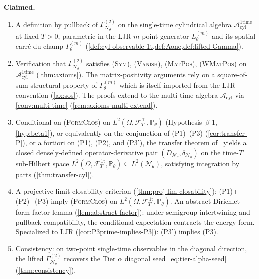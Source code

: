 \documentclass[11pt,reqno]{amsart}
\theoremstyle{plain}
\theoremstyle{definition}
\theoremstyle{remark}
\newcommand{\Prob}{\mathbb P}
\newcommand{\cA}{\mathcal A}
\newcommand{\cF}{\mathcal F}
\newcommand{\cN}{\mathcal N}
\newcommand{\Acyl}{\cA_{\mathrm{cyl}}}
\newcommand{\Aone}{\cA_{\mathrm{cyl}}^{\mathrm{1time}}}
\newcommand{\FT}{\cF_{T}^{\,\mathrm{1t}}}
\newcommand{\Hone}{L^{2}(\Omega,\FT,\Pth)}
\newcommand{\GamN}{\Gamma^{(2)}_{\cN_{\theta}}}
\newcommand{\GamM}[1]{\Gamma^{(#1)}_{\theta}}
\newcommand{\Lth}[1]{L^{(#1)}_{\theta}}
\newcommand{\DN}{D_{\cN_{\theta}}}
\newcommand{\divN}{\delta_{\cN_{\theta}}}
\newcommand{\Pth}{\Prob_{\theta}}
\begin{document}
\textbf{Claimed.}
\begin{enumerate}
\item A definition by pullback of $\GamN$ on the single-time
cylindrical algebra $\Aone$ at fixed $T>0$, parametric in the LJR
$m$-point generator $\Lth{m}$ and its spatial carr\'e-du-champ
$\GamM{m}$
(\cref{def:cyl-observable-1t,def:Aone,def:lifted-Gamma}).

\item Verification that $\GamN$ satisfies
{\normalfont\textsc{(Sym)}}, {\normalfont\textsc{(Vanish)}},
{\normalfont\textsc{(MatPos)}}, {\normalfont\textsc{(WMatPos)}} on
$\Aone$ (\cref{thm:axioms}). The matrix-positivity arguments rely
on a square-of-sum structural property of $\GamM{m}$ which is
itself imported from the LJR convention (\cref{ax:sos}). The
proofs extend to the multi-time algebra $\Acyl$ via
\cref{conv:multi-time} (\cref{rem:axioms-multi-extend}).

\item Conditional on {\normalfont\textsc{(FormClos)}} on $\Hone$
(Hypothesis~$\beta$-1, \cref{hyp:beta1}), or equivalently on
the conjunction of {\normalfont (P1)}--{\normalfont (P3)}
(\cref{cor:transfer-P}), or a fortiori on
{\normalfont (P1)}, {\normalfont (P2)}, and {\normalfont (P3')},
the transfer theorem of~\cite{GammaHierarchyDivergence} yields a
closed densely-defined operator-derivative pair $(\DN,\divN)$ on
the time-$T$ sub-Hilbert space $\Hone\subseteq L^{2}(\cN_{\theta})$,
satisfying integration by parts (\cref{thm:transfer-cyl}).

\item A projective-limit closability criterion
(\cref{thm:proj-lim-closability}): {\normalfont (P1)+(P2)+(P3)}
imply {\normalfont\textsc{(FormClos)}} on $\Hone$. An abstract
Dirichlet-form factor lemma (\cref{lem:abstract-factor}):
under semigroup intertwining and pullback compatibility, the
conditional expectation contracts the energy form. Specialized to
LJR (\cref{cor:P3prime-implies-P3}): {\normalfont (P3')} implies
{\normalfont (P3)}.

\item Consistency: on two-point single-time observables in the
diagonal direction, the lifted $\GamN$ recovers the Tier $\alpha$
diagonal seed~\eqref{eq:tier-alpha-seed}
(\cref{thm:consistency}).
\end{enumerate}
\end{document}
